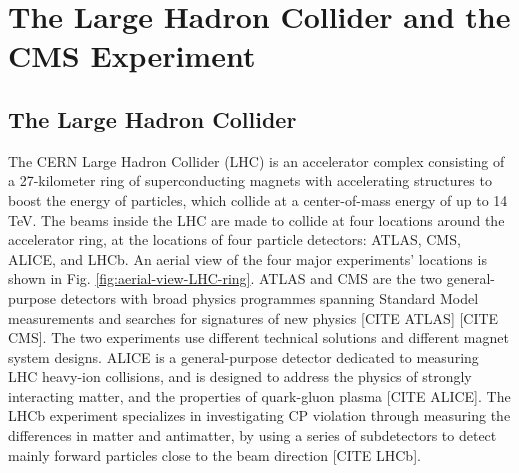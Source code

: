 \documentclass{article}
\begin{document}
\section{The Large Hadron Collider and the CMS Experiment}


\subsection{The Large Hadron Collider}

The CERN Large Hadron Collider (LHC) is an accelerator complex consisting of a 27-kilometer ring of superconducting magnets with accelerating structures to boost the energy of particles, which collide at a center-of-mass energy of up to 14 TeV. The beams inside the LHC are made to collide at four locations around the accelerator ring, at the locations of four particle detectors: ATLAS, CMS, ALICE, and LHCb. An aerial view of the four major experiments' locations is shown in Fig. \ref{fig:aerial-view-LHC-ring}. ATLAS and CMS are the two general-purpose detectors with broad physics programmes spanning Standard Model measurements and searches for signatures of new physics [CITE ATLAS] [CITE CMS]. The two experiments use different technical solutions and different magnet system designs. ALICE is a general-purpose detector dedicated to measuring LHC heavy-ion collisions, and is designed to address the physics of strongly interacting matter, and the properties of quark-gluon plasma [CITE ALICE]. The LHCb experiment specializes in investigating CP violation through measuring the differences in matter and antimatter, by using a series of subdetectors to detect mainly forward particles close to the beam direction [CITE LHCb]. 
\end{document}
